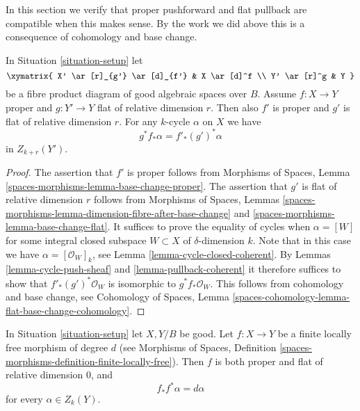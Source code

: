 \medskip\noindent
In this section we verify that proper pushforward and flat pullback
are compatible when this makes sense. By the work we did above this
is a consequence of cohomology and base change.

\begin{lemma}
\label{lemma-flat-pullback-proper-pushforward}
In Situation \ref{situation-setup} let
$$
\xymatrix{
X' \ar[r]_{g'} \ar[d]_{f'} & X \ar[d]^f \\
Y' \ar[r]^g & Y
}
$$
be a fibre product diagram of good algebraic spaces over $B$.
Assume $f : X \to Y$ proper and $g : Y' \to Y$ flat of relative dimension $r$.
Then also $f'$ is proper and $g'$ is flat of relative dimension $r$.
For any $k$-cycle $\alpha$ on $X$ we have
$$
g^*f_*\alpha = f'_*(g')^*\alpha
$$
in $Z_{k + r}(Y')$.
\end{lemma}

\begin{proof}
The assertion that $f'$ is proper follows from
Morphisms of Spaces, Lemma \ref{spaces-morphisms-lemma-base-change-proper}.
The assertion that $g'$ is flat of relative dimension $r$ follows from
Morphisms of Spaces, Lemmas
\ref{spaces-morphisms-lemma-dimension-fibre-after-base-change}
and \ref{spaces-morphisms-lemma-base-change-flat}.
It suffices to prove the equality of cycles when $\alpha = [W]$
for some integral closed subspace $W \subset X$ of $\delta$-dimension $k$.
Note that in this case we have $\alpha = [\mathcal{O}_W]_k$, see
Lemma \ref{lemma-cycle-closed-coherent}.
By Lemmas \ref{lemma-cycle-push-sheaf} and
\ref{lemma-pullback-coherent} it therefore suffices
to show that $f'_*(g')^*\mathcal{O}_W$ is isomorphic to
$g^*f_*\mathcal{O}_W$. This follows from cohomology and
base change, see Cohomology of Spaces, Lemma
\ref{spaces-cohomology-lemma-flat-base-change-cohomology}.
\end{proof}

\begin{lemma}
\label{lemma-finite-flat}
In Situation \ref{situation-setup} let $X, Y/B$ be good.
Let $f : X \to Y$ be a finite locally free morphism
of degree $d$ (see
Morphisms of Spaces, Definition
\ref{spaces-morphisms-definition-finite-locally-free}).
Then $f$ is both proper and flat of relative dimension $0$, and
$$
f_*f^*\alpha = d\alpha
$$
for every $\alpha \in Z_k(Y)$.
\end{lemma}

